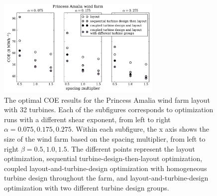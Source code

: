 

\begin{figure}[htbp]
  \centering
  \includegraphics[width=0.7\textwidth]{Figures/amalia_results1.pdf}
  \caption{\label{amalia_results} The optimal COE results for the Princess Amalia wind farm layout with 32 turbines. Each of the subfigures corresponds to optimization runs with a different shear exponent, from left to right $\alpha=0.075,0.175,0.275$. Within each subfigure, the x axis shows the size of the wind farm based on the spacing multiplier, from left to right $\beta=0.5,1.0,1.5$. The different points represent the layout optimization, sequential turbine-design-then-layout optimization, coupled layout-and-turbine-design optimization with homogeneous turbine design throughout the farm, and layout-and-turbine-design optimization with two different turbine design groups.}
\end{figure}



